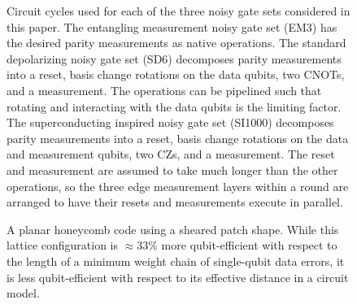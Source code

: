\documentclass[onecolumn,unpublished,a4paper]{quantumarticle}
\theoremstyle{definition}
\theoremstyle{definition}
\theoremstyle{definition}
\begin{document}
\begin{figure}[h]
    \centering
    \caption{
    Circuit cycles used for each of the three noisy gate sets considered in this paper.
    The entangling measurement noisy gate set (EM3) has the desired parity measurements as native operations.
    The standard depolarizing noisy gate set (SD6) decomposes parity measurements into a reset, basis change rotations on the data qubits, two CNOTs, and a measurement.
    The operations can be pipelined such that rotating and interacting with the data qubits is the limiting factor.
    The superconducting inspired noisy gate set (SI1000) decomposes parity measurements into a reset, basis change rotations on the data and measurement qubits, two CZs, and a measurement.
    The reset and measurement are assumed to take much longer than the other operations, so the three edge measurement layers within a round are arranged to have their resets and measurements execute in parallel.
    }
    \label{fig:circuit_cycles}
\end{figure}

\begin{figure}[h]
    \centering
    \caption{
    A planar honeycomb code using a sheared patch shape.
    While this lattice configuration is $\approx33\%$ more qubit-efficient with respect to the length of a minimum weight chain of single-qubit data errors, it is less qubit-efficient with respect to its effective distance in a circuit model.
    }
    \label{fig:sheared}
\end{figure}
\end{document}
